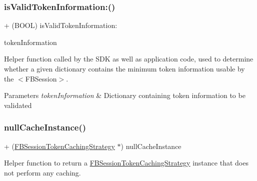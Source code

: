 \subsubsection{\texorpdfstring{is\+Valid\+Token\+Information\+:()}{isValidTokenInformation:()}\hspace{0.1cm}{\footnotesize\ttfamily [5/5]}}
{\footnotesize\ttfamily + (B\+O\+OL) is\+Valid\+Token\+Information\+: \begin{DoxyParamCaption}\item[{(N\+S\+Dictionary $\ast$)}]{token\+Information }\end{DoxyParamCaption}}

Helper function called by the S\+DK as well as application code, used to determine whether a given dictionary contains the minimum token information usable by the $<$\+F\+B\+Session$>$.


\begin{DoxyParams}{Parameters}
{\em token\+Information} & Dictionary containing token information to be validated \\
\hline
\end{DoxyParams}
\mbox{\label{interfaceFBSessionTokenCachingStrategy_a97f1da9c8423d4e6bbca2241bd894032}} 
\subsubsection{\texorpdfstring{null\+Cache\+Instance()}{nullCacheInstance()}\hspace{0.1cm}{\footnotesize\ttfamily [1/5]}}
{\footnotesize\ttfamily + (\hyperlink{interfaceFBSessionTokenCachingStrategy}{F\+B\+Session\+Token\+Caching\+Strategy} $\ast$) null\+Cache\+Instance \begin{DoxyParamCaption}{ }\end{DoxyParamCaption}}

Helper function to return a \hyperlink{interfaceFBSessionTokenCachingStrategy}{F\+B\+Session\+Token\+Caching\+Strategy} instance that does not perform any caching. \mbox{\label{interfaceFBSessionTokenCachingStrategy_a97f1da9c8423d4e6bbca2241bd894032}} 
